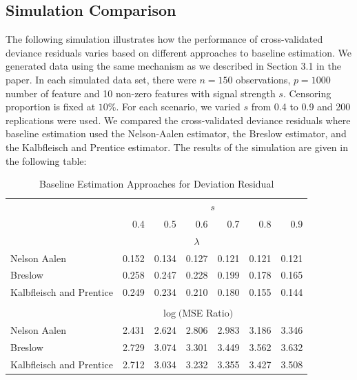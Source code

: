 \documentclass{article}
\begin{document}
\subsection{Simulation Comparison}

The following simulation illustrates how the performance of cross-validated deviance residuals varies based on different approaches to baseline estimation. We generated data using the same mechanism as we described in Section 3.1 in the paper. In each simulated data set, there were $n = 150$ observations, $p = 1000$ number of feature and 10 non-zero features with signal strength $s$. Censoring proportion is fixed at $10\%$. For each scenario, we varied $s$ from 0.4 to 0.9 and 200 replications were used. We compared the cross-validated deviance residuals where baseline estimation used the Nelson-Aalen estimator, the Breslow estimator, and the Kalbfleisch and Prentice estimator.
The results of the simulation are given in the following table:

\begin{table}[!htb]
\centering
\caption{\label{Tab:base} Baseline Estimation Approaches for Deviation Residual}
\begin{tabular}{lrrrrrr}
\toprule
 & \multicolumn{6}{c}{$s$} \\ 
 & 0.4 & 0.5 & 0.6 & 0.7 & 0.8 & 0.9\\
\midrule
\vspace{1mm}
 & \multicolumn{5}{c}{$\lambda$} & \\ 
\vspace{1mm}
Nelson Aalen & 0.152 & 0.134 & 0.127 & 0.121 & 0.121 & 0.121\\
Breslow & 0.258 & 0.247 & 0.228 & 0.199 & 0.178 & 0.165\\
Kalbfleisch and Prentice & 0.249 & 0.234 & 0.210 & 0.180 & 0.155 & 0.144\\
\vspace{0.5mm}\\
 & \multicolumn{5}{c}{$\log($MSE Ratio$)$} & \\ 
\vspace{1mm}
Nelson Aalen & 2.431 & 2.624 & 2.806 & 2.983 & 3.186 & 3.346 \\
Breslow & 2.729 & 3.074 & 3.301 & 3.449 & 3.562 & 3.632 \\
Kalbfleisch and Prentice & 2.712 & 3.034 & 3.232 & 3.355 & 3.427 & 3.508 \\
\bottomrule
\end{tabular}
\end{table}
\end{document}
